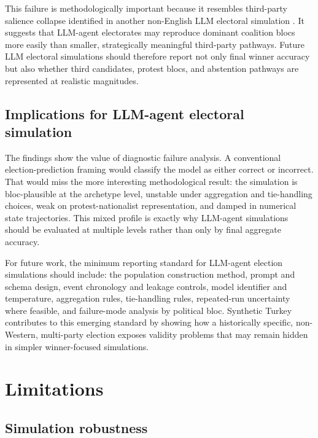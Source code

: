 \documentclass[pdflatex,sn-mathphys-num,iicol]{sn-jnl}
\begin{document}
This failure is methodologically important because it resembles third-party
salience collapse identified in another non-English LLM electoral simulation
\cite{kang2026dynamok}. It suggests that LLM-agent electorates may reproduce
dominant coalition blocs more easily than smaller, strategically meaningful
third-party pathways. Future LLM electoral simulations should therefore report
not only final winner accuracy but also whether third candidates, protest blocs,
and abstention pathways are represented at realistic magnitudes.

\subsection{Implications for LLM-agent electoral
simulation}\label{subsec:implications}

The findings show the value of diagnostic failure analysis. A conventional
election-prediction framing would classify the model as either correct or
incorrect. That would miss the more interesting methodological result: the
simulation is bloc-plausible at the archetype level, unstable under aggregation
and tie-handling choices, weak on protest-nationalist representation, and damped
in numerical state trajectories. This mixed profile is exactly why LLM-agent
simulations should be evaluated at multiple levels rather than only by final
aggregate accuracy.

For future work, the minimum reporting standard for LLM-agent election
simulations should include: the population construction method, prompt and
schema design, event chronology and leakage controls, model identifier and
temperature, aggregation rules, tie-handling rules, repeated-run uncertainty
where feasible, and failure-mode analysis by political bloc. Synthetic Turkey
contributes to this emerging standard by showing how a historically specific,
non-Western, multi-party election exposes validity problems that may remain
hidden in simpler winner-focused simulations.


\section{Limitations}\label{sec:limitations}

\subsection{Simulation robustness}\label{subsec:robustness}
\end{document}
